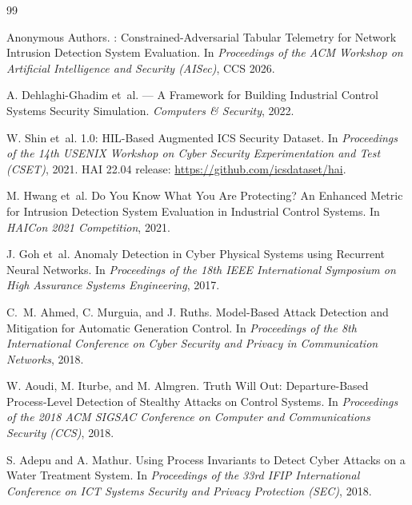 \documentclass[sigconf,anonymous,review]{acmart}
\begin{document}

\begin{thebibliography}{99}

Anonymous Authors.
: Constrained-Adversarial Tabular Telemetry for Network
  Intrusion Detection System Evaluation.
\newblock In \emph{Proceedings of the ACM Workshop on Artificial Intelligence
  and Security (AISec)}, CCS 2026.

A. Dehlaghi-Ghadim et~al.
 — A Framework for Building Industrial Control Systems
  Security Simulation.
\newblock \emph{Computers \& Security}, 2022.

W. Shin et~al.
 1.0: {HIL}-Based Augmented {ICS} Security Dataset.
\newblock In \emph{Proceedings of the 14th USENIX Workshop on Cyber Security
  Experimentation and Test (CSET)}, 2021.
\newblock HAI 22.04 release: \url{https://github.com/icsdataset/hai}.

M. Hwang et~al.
\newblock Do You Know What You Are Protecting? An Enhanced Metric for
  Intrusion Detection System Evaluation in Industrial Control Systems.
\newblock In \emph{HAICon 2021 Competition}, 2021.

J. Goh et~al.
\newblock Anomaly Detection in Cyber Physical Systems using Recurrent Neural
  Networks.
\newblock In \emph{Proceedings of the 18th IEEE International Symposium on
  High Assurance Systems Engineering}, 2017.

C.~M. Ahmed, C. Murguia, and J. Ruths.
\newblock Model-Based Attack Detection and Mitigation for Automatic Generation
  Control.
\newblock In \emph{Proceedings of the 8th International Conference on Cyber
  Security and Privacy in Communication Networks}, 2018.

W. Aoudi, M. Iturbe, and M. Almgren.
\newblock Truth Will Out: Departure-Based Process-Level Detection of Stealthy
  Attacks on Control Systems.
\newblock In \emph{Proceedings of the 2018 ACM SIGSAC Conference on Computer
  and Communications Security (CCS)}, 2018.

S. Adepu and A. Mathur.
\newblock Using Process Invariants to Detect Cyber Attacks on a Water
  Treatment System.
\newblock In \emph{Proceedings of the 33rd IFIP International Conference on
  ICT Systems Security and Privacy Protection (SEC)}, 2018.


\end{thebibliography}
\end{document}
